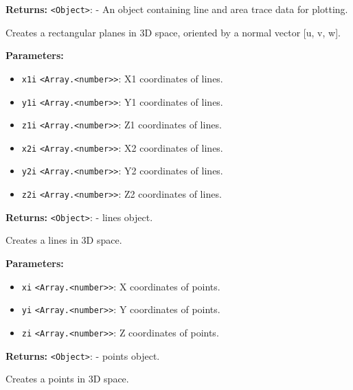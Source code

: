 \documentclass[12pt,a4paper]{article}
\begin{document}
\noindent \textbf{Returns:} \texttt{<Object>}: - An object containing line and area trace data for plotting.

\noindent Creates a rectangular planes in 3D space, oriented by a normal vector [u, v, w].

\vspace{5mm}
\noindent {}


\noindent \textbf{Parameters:}
\begin{itemize}
  \item \texttt{x1i} \texttt{<Array.<number>>}: X1 coordinates of lines.
  \item \texttt{y1i} \texttt{<Array.<number>>}: Y1 coordinates of lines.
  \item \texttt{z1i} \texttt{<Array.<number>>}: Z1 coordinates of lines.
  \item \texttt{x2i} \texttt{<Array.<number>>}: X2 coordinates of lines.
  \item \texttt{y2i} \texttt{<Array.<number>>}: Y2 coordinates of lines.
  \item \texttt{z2i} \texttt{<Array.<number>>}: Z2 coordinates of lines.
\end{itemize}

\noindent \textbf{Returns:} \texttt{<Object>}: - lines object.

\noindent Creates a lines in 3D space.

\vspace{5mm}
\noindent {}


\noindent \textbf{Parameters:}
\begin{itemize}
  \item \texttt{xi} \texttt{<Array.<number>>}: X coordinates of points.
  \item \texttt{yi} \texttt{<Array.<number>>}: Y coordinates of points.
  \item \texttt{zi} \texttt{<Array.<number>>}: Z coordinates of points.
\end{itemize}

\noindent \textbf{Returns:} \texttt{<Object>}: - points object.

\noindent Creates a points in 3D space.
\end{document}
